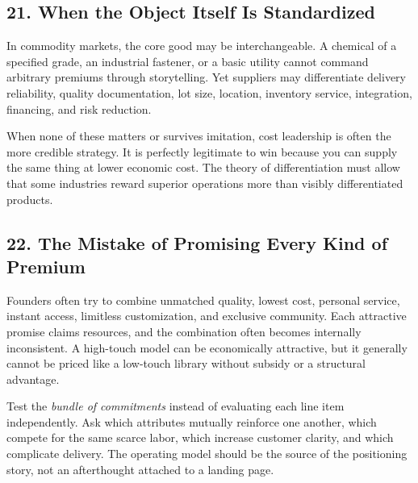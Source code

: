\subsection*{21. When the Object Itself Is Standardized}

In commodity markets, the core good may be interchangeable. A chemical of a specified grade, an industrial fastener, or a basic utility cannot command arbitrary premiums through storytelling. Yet suppliers may differentiate delivery reliability, quality documentation, lot size, location, inventory service, integration, financing, and risk reduction.

When none of these matters or survives imitation, cost leadership is often the more credible strategy. It is perfectly legitimate to win because you can supply the same thing at lower economic cost. The theory of differentiation must allow that some industries reward superior operations more than visibly differentiated products.

\subsection*{22. The Mistake of Promising Every Kind of Premium}

Founders often try to combine unmatched quality, lowest cost, personal service, instant access, limitless customization, and exclusive community. Each attractive promise claims resources, and the combination often becomes internally inconsistent. A high-touch model can be economically attractive, but it generally cannot be priced like a low-touch library without subsidy or a structural advantage.

Test the \emph{bundle of commitments} instead of evaluating each line item independently. Ask which attributes mutually reinforce one another, which compete for the same scarce labor, which increase customer clarity, and which complicate delivery. The operating model should be the source of the positioning story, not an afterthought attached to a landing page.
